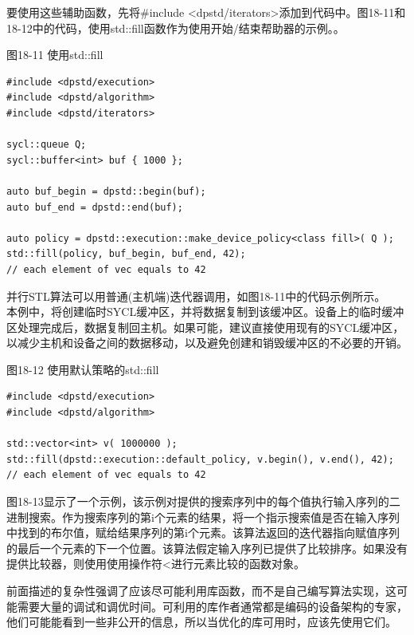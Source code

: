 要使用这些辅助函数，先将\#include <dpstd/iterators>添加到代码中。图18-11和18-12中的代码，使用std::fill函数作为使用开始/结束帮助器的示例。。\par

\hspace*{\fill} \par %
图18-11 使用std::fill
\begin{lstlisting}[caption={}]
#include <dpstd/execution>
#include <dpstd/algorithm>
#include <dpstd/iterators>

sycl::queue Q;
sycl::buffer<int> buf { 1000 };

auto buf_begin = dpstd::begin(buf);
auto buf_end = dpstd::end(buf);

auto policy = dpstd::execution::make_device_policy<class fill>( Q );
std::fill(policy, buf_begin, buf_end, 42);
// each element of vec equals to 42
\end{lstlisting}

\begin{tcolorbox}[colback=blue!5!white,colframe=blue!75!black, title=减少主机和设备之间的数据复制]
并行STL算法可以用普通(主机端)迭代器调用，如图18-11中的代码示例所示。\\

本例中，将创建临时SYCL缓冲区，并将数据复制到该缓冲区。设备上的临时缓冲区处理完成后，数据复制回主机。如果可能，建议直接使用现有的SYCL缓冲区，以减少主机和设备之间的数据移动，以及避免创建和销毁缓冲区的不必要的开销。
\end{tcolorbox}

\hspace*{\fill} \par %
图18-12 使用默认策略的std::fill
\begin{lstlisting}[caption={}]
#include <dpstd/execution>
#include <dpstd/algorithm>

std::vector<int> v( 1000000 );
std::fill(dpstd::execution::default_policy, v.begin(), v.end(), 42);
// each element of vec equals to 42
\end{lstlisting}

图18-13显示了一个示例，该示例对提供的搜索序列中的每个值执行输入序列的二进制搜索。作为搜索序列的第i个元素的结果，将一个指示搜索值是否在输入序列中找到的布尔值，赋给结果序列的第i个元素。该算法返回的迭代器指向赋值序列的最后一个元素的下一个位置。该算法假定输入序列已提供了比较排序。如果没有提供比较器，则使用使用操作符<进行元素比较的函数对象。\par

前面描述的复杂性强调了应该尽可能利用库函数，而不是自己编写算法实现，这可能需要大量的调试和调优时间。可利用的库作者通常都是编码的设备架构的专家，他们可能能看到一些非公开的信息，所以当优化的库可用时，应该先使用它们。\par

